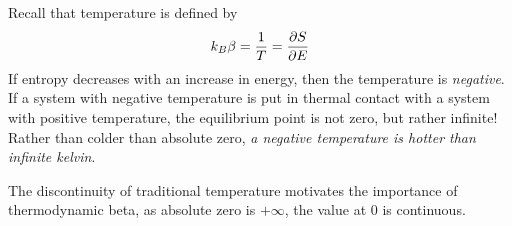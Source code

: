 \begin{aside}
	Recall that temperature is defined by
	\[k_B\beta = \frac{1}{T}=\frac{\partial S}{\partial E}\]
	If entropy decreases with an increase in energy, then the temperature is \emph{negative}. If a system with negative temperature is put in thermal contact with a system with positive temperature, the equilibrium point is not zero, but rather infinite! Rather than colder than absolute zero, \emph{a negative temperature is hotter than infinite kelvin}.

	The discontinuity of traditional temperature motivates the importance of thermodynamic beta, as absolute zero is \(+\infty\), the value at \(0\) is continuous. 
\end{aside}

